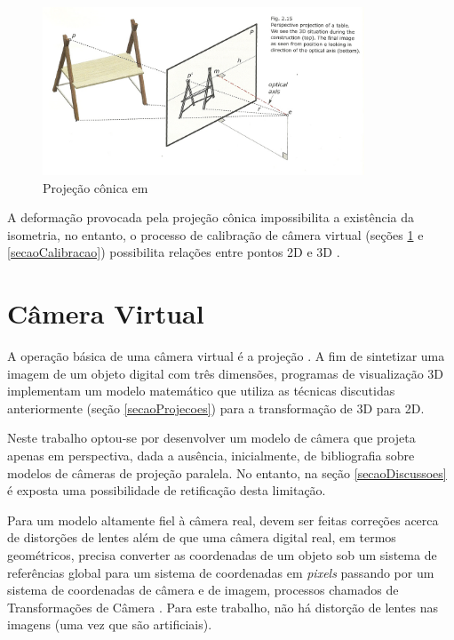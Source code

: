 			\begin{figure}[!htb]
				\centering
				\includegraphics[height=5cm]{imagens/projecaoConica.jpg}
				\caption{Projeção cônica em \cite{archiGeoBook}}
				\label{imagemProjecaoConica}
			\end{figure}
			
			A deformação provocada pela projeção cônica impossibilita a existência da isometria, no entanto, o processo de calibração de câmera virtual (seções \ref{secaoCamera} e \ref{secaoCalibracao}) possibilita relações entre pontos 2D e 3D \cite{juizVirtual}.
	
	\section{Câmera Virtual}
		\label{secaoCamera}
	
		A operação básica de uma câmera virtual é a projeção \cite{fundCompGraf}. A fim de sintetizar uma imagem de um objeto digital com três dimensões, programas de visualização 3D implementam um modelo matemático que utiliza as técnicas discutidas anteriormente (seção \ref{secaoProjecoes}) para a transformação de 3D para 2D.
		
		Neste trabalho optou-se por desenvolver um modelo de câmera que projeta apenas em perspectiva, dada a ausência, inicialmente, de bibliografia sobre modelos de câmeras de projeção paralela. No entanto, na seção \ref{secaoDiscussoes} é exposta uma possibilidade de retificação desta limitação.
		
		Para um modelo altamente fiel à câmera real, devem ser feitas correções acerca de distorções de lentes \cite{animation} além de que uma câmera digital real, em termos geométricos, precisa converter as coordenadas de um objeto sob um sistema de referências global para um sistema de coordenadas em \textit{pixels} passando por um sistema de coordenadas de câmera e de imagem, processos chamados de Transformações de Câmera \cite{foto3D}. Para este trabalho, não há distorção de lentes nas imagens (uma vez que são artificiais).
		
